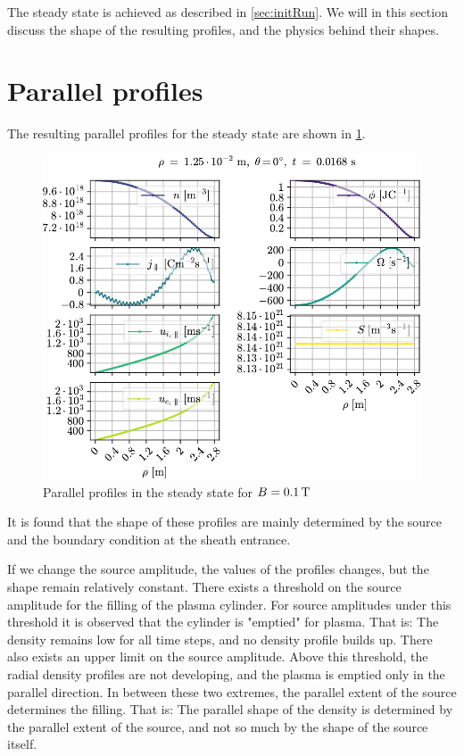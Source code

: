 The steady state is achieved as described in \cref{sec:initRun}.
We will in this section discuss the shape of the resulting profiles, and the physics behind their shapes.

\section{Parallel profiles}
%
The resulting parallel profiles for the steady state are shown in \cref{fig:parProfs}.
%
\begin{figure}[htb]
    \centering
    \includegraphics{fig/results/1DProfiles/B010Par}
    \caption{Parallel profiles in the steady state for $B=0.1\, \text{T}$}
    \label{fig:parProfs}
\end{figure}
%
It is found that the shape of these profiles are mainly determined by the source and the boundary condition at the sheath entrance.

If we change the source amplitude, the values of the profiles changes, but the shape remain relatively constant.
There exists a threshold on the source amplitude for the filling of the plasma cylinder.
For source amplitudes under this threshold it is observed that the cylinder is "emptied" for plasma.
That is: The density remains low for all time steps, and no density profile builds up.
There also exists an upper limit on the source amplitude.
Above this threshold, the radial density profiles are not developing, and the plasma is emptied only in the parallel direction.
In between these two extremes, the parallel extent of the source determines the filling.
That is: The parallel shape of the density is determined by the parallel extent of the source, and not so much by the shape of the source itself.

